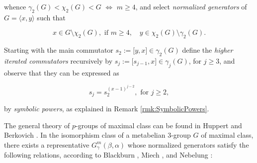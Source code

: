\documentclass{amsart}
\theoremstyle{definition}
\numberwithin{equation}{section}
\begin{document}
\noindent
whence \(\gamma_2(G)<\chi_2(G)<G\) \(\Longleftrightarrow\) \(m\ge 4\),
and select \textit{normalized generators} of \(G=\langle x,y\rangle\) such that

\begin{equation}
\label{eqn:GeneratorsMax3}
x\in G\setminus\chi_2(G), \text{ if } m\ge 4, \quad y\in\chi_2(G)\setminus\gamma_2(G).
\end{equation}

\noindent
Starting with the main commutator \(s_2:=\lbrack y,x\rbrack\in\gamma_2(G)\)
define the \textit{higher iterated commutators} recursively by
\(s_j:=\lbrack s_{j-1},x\rbrack\in\gamma_j(G)\), for \(j\ge 3\),
and observe that they can be expressed as

\begin{equation}
\label{eqn:SymbolicPowersMax3}
s_j=s_2^{(x-1)^{j-2}}, \text{ for } j\ge 2,
\end{equation}

\noindent
by \textit{symbolic powers}, as explained in Remark
\ref{rmk:SymbolicPowers}.


The general theory of \(p\)-groups of maximal class can be found in Huppert
\cite[\S\ 14, p. 361]{Hp}
and Berkovich
\cite[\S\ 9, p. 114]{Bv}.
In the isomorphism class of a metabelian \(3\)-group \(G\) of maximal class,
there exists a representative \(G_\gamma^m(\beta,\alpha)\)
whose normalized generators satisfy the following relations,
according to Blackburn
\cite{Bl},
Miech
\cite{Mi1,Mi2},
and Nebelung
\cite[\S\ 3.2, p. 58]{Ne1}:
\end{document}

